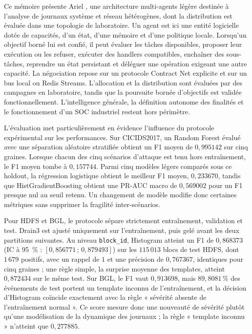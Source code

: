 
Ce mémoire présente Ariel \logminer{}, une architecture multi-agents légère
destinée à l'analyse de journaux système et réseau hétérogènes, dont la
distribution est évaluée dans une topologie de laboratoire. Un agent est ici
une entité logicielle dotée de capacités, d'un état, d'une mémoire et d'une
politique locale. Lorsqu'un objectif borné lui est confié, il peut évaluer les
tâches disponibles, proposer leur exécution ou les refuser, exécuter des
handlers compatibles, enchaîner des sous-tâches, reprendre un état persistant
et déléguer une opération exigeant une autre capacité. La négociation repose
sur un protocole Contract Net explicite et sur un bus local ou Redis Streams.
L'allocation et la distribution sont évaluées par des campagnes en laboratoire,
tandis que la poursuite bornée d'objectifs est validée fonctionnellement.
L'intelligence générale, la définition autonome des finalités et le
fonctionnement d'un SOC industriel restent hors périmètre.

L'évaluation met particulièrement en évidence l'influence du protocole
expérimental sur les performances. Sur CICIDS2017, un Random Forest évalué
avec une séparation aléatoire stratifiée obtient un F1 moyen de
$0{,}995142$ sur cinq graines. Lorsque chacun des cinq scénarios d'attaque
est tenu hors entraînement, le F1 moyen tombe à $0{,}157744$. Parmi cinq
modèles légers comparés sous ce holdout, la régression logistique obtient
le meilleur F1 moyen, $0{,}233670$, tandis que HistGradientBoosting obtient
une PR-AUC macro de $0{,}569002$ pour un F1 presque nul au seuil retenu. Un
changement de modèle modifie donc certaines métriques sans supprimer la
fragilité inter-scénarios.

Pour HDFS et BGL, le protocole sépare strictement entraînement, validation et
test. Drain3 est ajusté uniquement sur l'entraînement, puis gelé avant les
deux partitions suivantes. Au niveau \texttt{block\_id}, Histogram atteint un
F1 de $0{,}868373$ (IC à 95~\% : $[0{,}856771\,;\,0{,}879493]$) sur les
$115\,013$ blocs de test HDFS, dont $1\,679$ positifs, avec un rappel de $1$
et une précision de $0{,}767367$, identiques pour cinq graines ; une règle simple, la surprise moyenne des templates, atteint $0{,}872434$ sur le même test. Sur BGL, le F1
vaut $0{,}913698$, mais $89{,}8081\,\%$ des événements de test portent un
template inconnu de l'entraînement, et la décision d'Histogram coïncide
exactement avec la règle « sévérité absente de l'entraînement normal ». Ce
score mesure donc une nouveauté de sévérité plutôt qu'une modélisation de la
dynamique des journaux ; la règle « template inconnu » n'atteint que
$0{,}277885$.

